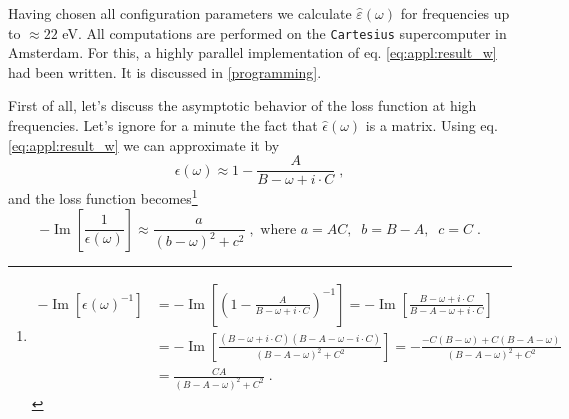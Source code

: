 \documentclass[a4paper,12pt]{article}
\begin{document}
    Having chosen all configuration parameters we calculate $\hat \varepsilon(\omega)$ for frequencies up to $\approx\! 22$ eV. All computations are performed on the \texttt{Cartesius} supercomputer in Amsterdam. For this, a highly parallel implementation of eq. \eqref{eq:appl:result_w} had been written. It is discussed in \ref{programming}.

    First of all, let's discuss the asymptotic behavior of the loss function at high frequencies. Let's ignore for a minute the fact that $\hat\epsilon(\omega)$ is a matrix. Using eq. \eqref{eq:appl:result_w} we can approximate it by 
    \begin{equation*}
        \epsilon(\omega) \approx 1 - \frac{A}{B - \omega + i\cdot C} \; ,
    \end{equation*}
    and the loss function becomes\footnote{ %
    \begin{equation*}
        \begin{aligned}
        -\operatorname{Im}[\epsilon(\omega)^{-1}] &= -\operatorname{Im}\left[\left(1 - \frac{A}{B - \omega + i\cdot C}\right)^{-1}\right]
        = -\operatorname{Im}\left[\frac{B - \omega + i\cdot C}{B - A - \omega + i\cdot C}\right] \\
        &= -\operatorname{Im}\left[\frac{(B - \omega + i\cdot C)(B - A - \omega - i\cdot C)}{(B - A - \omega)^2 + C^2}\right]
        = -\frac{-C(B - \omega) + C(B - A - \omega)}{(B - A - \omega)^2 + C^2} \\
        &= \frac{CA}{(B - A - \omega)^2 + C^2} \; .
        \end{aligned}
    \end{equation*}
    } %
    \begin{equation} \label{eq:exp:asymptotic_approx}
        -\operatorname{Im}\left[\frac{1}{\epsilon(\omega)}\right] \approx \frac{a}{(b - \omega)^2 + c^2} \;,\text{ where }a=AC ,\;\; b = B-A ,\;\; c = C\;.
    \end{equation}
\end{document}
